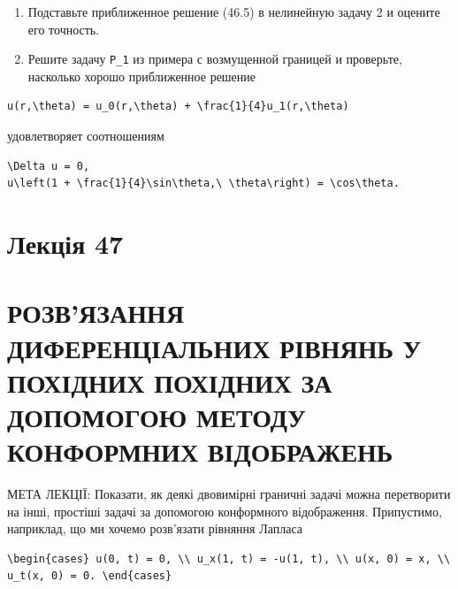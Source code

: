 \documentclass[
  ukrainian,
]{article}
\begin{document}
\begin{enumerate}
\def\labelenumi{\arabic{enumi}.}
\setcounter{enumi}{2}
\item
  Подставьте приближенное решение (46.5) в нелинейную задачу 2 и оцените
  его точность.
\item
  Решите задачу \texttt{P\_1} из примера с возмущенной границей и
  проверьте, насколько хорошо приближенное решение
\end{enumerate}

\begin{verbatim}
u(r,\theta) = u_0(r,\theta) + \frac{1}{4}u_1(r,\theta)
\end{verbatim}

удовлетворяет соотношениям

\begin{verbatim}
\Delta u = 0,
u\left(1 + \frac{1}{4}\sin\theta,\ \theta\right) = \cos\theta.
\end{verbatim}

\section{Лекція 47}\label{ux43bux435ux43aux446ux456ux44f-47}

\section{РОЗВ'ЯЗАННЯ ДИФЕРЕНЦІАЛЬНИХ РІВНЯНЬ У ПОХІДНИХ ПОХІДНИХ ЗА
ДОПОМОГОЮ МЕТОДУ КОНФОРМНИХ
ВІДОБРАЖЕНЬ}\label{ux440ux43eux437ux432ux44fux437ux430ux43dux43dux44f-ux434ux438ux444ux435ux440ux435ux43dux446ux456ux430ux43bux44cux43dux438ux445-ux440ux456ux432ux43dux44fux43dux44c-ux443-ux43fux43eux445ux456ux434ux43dux438ux445-ux43fux43eux445ux456ux434ux43dux438ux445-ux437ux430-ux434ux43eux43fux43eux43cux43eux433ux43eux44e-ux43cux435ux442ux43eux434ux443-ux43aux43eux43dux444ux43eux440ux43cux43dux438ux445-ux432ux456ux434ux43eux431ux440ux430ux436ux435ux43dux44c}

МЕТА ЛЕКЦІЇ: Показати, як деякі двовимірні граничні задачі можна
перетворити на інші, простіші задачі за допомогою конформного
відображення. Припустимо, наприклад, що ми хочемо розв'язати рівняння
Лапласа

\begin{verbatim}
\begin{cases} u(0, t) = 0, \\ u_x(1, t) = -u(1, t), \\ u(x, 0) = x, \\ u_t(x, 0) = 0. \end{cases}
\end{verbatim}
\end{document}

